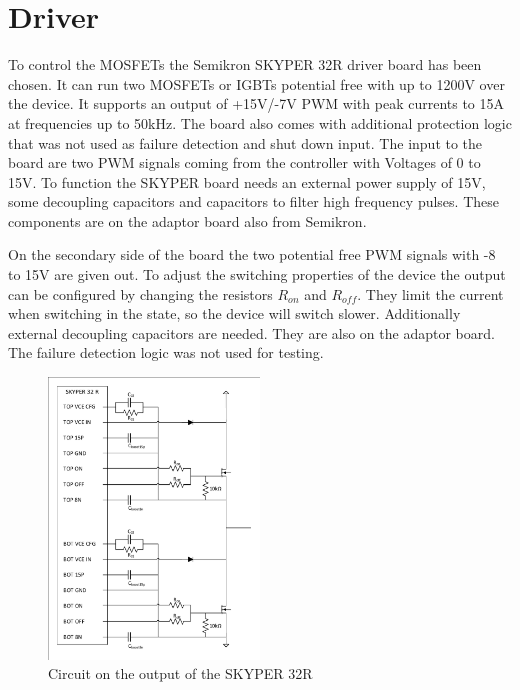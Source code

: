 \section{Driver}\label{sec:driver}

To control the MOSFETs the Semikron SKYPER 32R driver board has been chosen.\cite{Board1SK17:online}
It can run two MOSFETs or IGBTs potential free with up to 1200V over the device.
It supports an output of +15V/-7V PWM with peak currents to 15A at frequencies up to 50kHz.
The board also comes with additional protection logic that was not used as failure detection and shut down input.
The input to the board are two PWM signals coming from the controller with Voltages of 0 to 15V.
To function the SKYPER board needs an external power supply of 15V,
some decoupling capacitors and capacitors to filter high frequency pulses.
These components are on the adaptor board also from Semikron.

On the secondary side of the board the two potential free PWM signals with -8 to 15V are given out.\cite{SKYPER322:online}
To adjust the switching properties of the device the output can be configured by changing the resistors $R_{on}$ and $R_{off}$.
They limit the current when switching in the state, so the device will switch slower.
Additionally external decoupling capacitors are needed. They are also on the adaptor board.
The failure detection logic was not used for testing.

\begin{figure}[H]
   \centering
   \includegraphics[width=0.5\textwidth]{figures/Skyperboard/Skyper32out.pdf}
    \caption{Circuit on the output of the SKYPER 32R}
	\label{fig:Skyper32out}
\end{figure}

